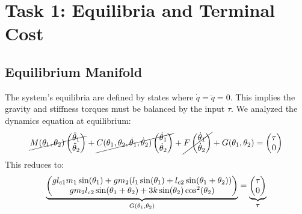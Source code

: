 

\section{Task 1: Equilibria and Terminal Cost}

\subsection{Equilibrium Manifold}
The system's equilibria are defined by states where $\dot{q} = \ddot{q} = 0$. This implies the gravity and stiffness torques must be balanced by the input $\tau$.
We analyzed the dynamics equation at equilibrium:
\begin{equation}
    \cancel{M(\theta_1, \theta_2) \begin{pmatrix} \ddot{\theta}_1 \\ \ddot{\theta}_2 \end{pmatrix}} + \cancel{C(\theta_1, \theta_2, \dot{\theta}_1, \dot{\theta}_2) \begin{pmatrix} \dot{\theta}_1 \\ \dot{\theta}_2 \end{pmatrix}} + \cancel{F \begin{pmatrix} \dot{\theta}_1 \\ \dot{\theta}_2 \end{pmatrix}} + G(\theta_1, \theta_2) = \begin{pmatrix} \tau \\ 0 \end{pmatrix}
\end{equation}
This reduces to:
\begin{equation}
    \underbrace{
    \begin{pmatrix} 
    gl_{c1}m_1 \sin(\theta_1) + gm_2(l_1 \sin(\theta_1) + l_{c2} \sin(\theta_1 + \theta_2)) \\ 
    gm_2l_{c2} \sin(\theta_1 + \theta_2) + 3k \sin(\theta_2) \cos^2(\theta_2) 
    \end{pmatrix}
    }_{G(\theta_1, \theta_2)} 
    = 
    \underbrace{
    \begin{pmatrix} \tau \\ 0 \end{pmatrix}
    }_{\boldsymbol{\tau}}
    \vspace{0.2cm}
\end{equation}

